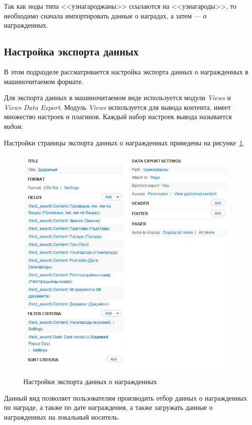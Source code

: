 Так как ноды типа <<узнагароджаны>> ссылаются на <<узнагароды>>, то
необходимо сначала импортировать данные о наградах, а затем --- о награжденных.

\subsection{Настройка экспорта данных}
\label{ssec:export_setup}

В этом подразделе рассматривается настройка экспорта данных о награжденных в 
машиночитаемом формате.

Для экспорта данных в машиночитаемом виде используется модули
\textit{Views} и \textit{Views Data Export}.
Модуль \textit{Views} используется для вывода контента, имеет множество настроек и 
плагинов. Каждый набор настроек вывода называется \textit{видом}.

Настройки страницы экспорта данных о награжденных приведены
на рисунке~\ref{fig:awarded_export}.

\begin{figure}[h]
  \centering
  \includegraphics[width=150mm]{pic/awarded_export.png}
  \caption{Настройки экспорта данных о награжденных}
  \label{fig:awarded_export}
\end{figure}

Данный вид позволяет пользователям производить отбор данных о награжденных
по награде, а также по дате награждения, а также загружать данные о награжденных
на локальный носитель.
